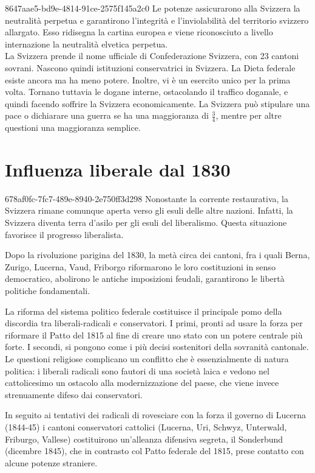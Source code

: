 \documentclass[preview]{standalone}
\begin{document}
\begin{snippet}{8647aae5-bd9e-4814-91ce-2575f145a2c0}
    Le potenze assicurarono alla Svizzera la neutralità perpetua e garantirono
    l'integrità e l'inviolabilità del territorio svizzero allargato.
    Esso ridisegna la cartina europea e viene riconosciuto a livello internazione la neutralità elvetica perpetua.
    \\
    La Svizzera prende il nome ufficiale di Confederazione Svizzera, con 23 cantoni sovrani.
    Nascono quindi istituzioni conservatrici in Svizzera.
    La Dieta federale esiste ancora ma ha meno potere.
    Inoltre, vi è un esercito unico per la prima volta.
    Tornano tuttavia le dogane interne, ostacolando il traffico doganale, e quindi facendo
    soffrire la Svizzera economicamente.
    La Svizzera può stipulare una pace o dichiarare una guerra se ha una maggioranza di \(\frac{3}{4}\),
    mentre per altre questioni una maggioranza semplice.
\end{snippet}

\section{Influenza liberale dal 1830}

\begin{snippet}{678af0fc-7fc7-489e-8940-2e750ff3d298}
    Nonostante la corrente restaurativa, la Svizzera rimane
    comunque aperta verso gli esuli delle altre nazioni.
    Infatti, la Svizzera diventa terra d'asilo per gli esuli del liberalismo.
    Questa situazione favorisce il progresso liberalista.
    
    Dopo la rivoluzione parigina del 1830, la metà circa dei cantoni, fra i quali Berna, Zurigo,
    Lucerna, Vaud, Friborgo riformarono le loro costituzioni in senso democratico,
    abolirono le antiche imposizioni feudali, garantirono le libertà politiche fondamentali.
    
    La riforma del sistema politico federale costituisce il principale pomo della discordia
    tra liberali-radicali e conservatori. I primi, pronti ad usare la forza per riformare il Patto
    del 1815 al fine di creare uno stato con un potere centrale più forte. I secondi, si
    pongono come i più decisi sostenitori della sovranità cantonale. Le questioni religiose
    complicano un conflitto che è essenzialmente di natura politica: i liberali radicali sono
    fautori di una società laica e vedono nel cattolicesimo un ostacolo alla modernizzazione
    del paese, che viene invece strenuamente difeso dai conservatori.
    
    In seguito ai tentativi dei radicali di rovesciare con la forza il governo di Lucerna (1844-45)
    i cantoni conservatori cattolici (Lucerna, Uri, Schwyz, Unterwald, Friburgo, Vallese)
    costituirono un'alleanza difensiva segreta, il Sonderbund (dicembre 1845), che in
    contrasto col Patto federale del 1815, prese contatto con alcune potenze straniere.
\end{snippet}
\end{document}

